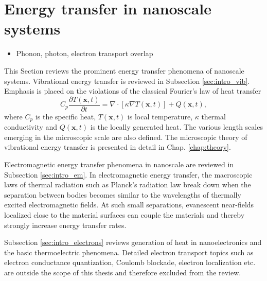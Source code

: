 \section{Energy transfer in nanoscale systems}
\begin{itemize}
 \item Phonon, photon, electron transport overlap
\end{itemize}
This Section reviews the prominent energy transfer phenomena of nanoscale systems. Vibrational energy transfer is reviewed in Subsection \ref{sec:intro_vib}. Emphasis is placed on the violations of the classical Fourier's law of heat transfer \cite{}
\begin{equation}
 C_p \frac{\partial T(\mathbf{x},t)}{\partial t} =  \nabla \cdot [\kappa \nabla T(\mathbf{x},t)] + Q(\mathbf{x},t), \label{eq:fourier}
\end{equation}
where $C_p$ is the specific heat, $T(\mathbf{x},t)$ is local temperature, $\kappa$ thermal conductivity and $Q(\mathbf{x},t)$ is the locally generated heat. The various length scales emerging in the microscopic scale are also defined. The microscopic theory of vibrational energy transfer is presented in detail in Chap. \ref{chap:theory}. 


Electromagnetic energy transfer phenomena in nanoscale are reviewed in Subsection \ref{sec:intro_em}. In electromagnetic energy transfer, the macroscopic laws of thermal radiation such as Planck's radiation law break down when the separation between bodies becomes similar to the wavelengths of thermally excited electromagnetic fields. At such small separations, evanescent near-fields localized close to the material surfaces can couple the materials and thereby strongly increase energy transfer rates. %

Subsection \ref{sec:intro_electrons} reviews generation of heat in nanoelectronics and the basic thermoelectric phenomena. Detailed electron transport topics such as electron conductance quantization, Coulomb blockade, electron localization etc. are outside the scope of this thesis and therefore excluded from the review. %


